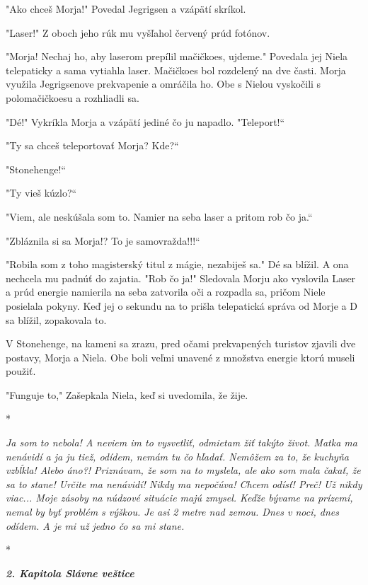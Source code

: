\documentclass{book}
\begin{document}
"$ $Ako chceš Morja!"$ $ Povedal Jegrigsen a vzápätí skríkol.

"Laser!"$ $ Z oboch jeho rúk mu vyšľahol červený prúd fotónov.

"Morja! Nechaj ho, aby laserom prepílil mačičkoes, ujdeme."$ $ Povedala jej Niela telepaticky a sama vytiahla laser. Mačičkoes bol rozdelený na dve časti. Morja využila Jegrigsenove prekvapenie a omráčila ho. Obe s Nielou vyskočili s polomačičkoesu a rozhliadli sa.

"Dé!"$ $ Vykríkla Morja a vzápätí jediné čo ju napadlo. "Teleport!“

"Ty sa chceš teleportovať Morja? Kde?“

"Stonehenge!“

"Ty vieš kúzlo?“

"Viem, ale neskúšala som to. Namier na seba laser a pritom rob čo ja.“

"Zbláznila si sa Morja!? To je samovražda!!!“

"Robila som z toho magisterský titul z mágie, nezabiješ sa."$ $ Dé sa blížil. A ona nechcela mu padnúť do zajatia. "Rob čo ja!"$ $ Sledovala Morju ako vyslovila Laser a prúd energie namierila na seba zatvorila oči a rozpadla sa, pričom Niele posielala pokyny. Keď jej o sekundu na to prišla telepatická správa od Morje a D sa blížil, zopakovala to.

V Stonehenge, na kameni sa zrazu, pred očami prekvapených turistov zjavili dve postavy, Morja a Niela. Obe boli veľmi unavené z množstva energie ktorú museli použiť.

"Funguje to,"$ $ Zašepkala Niela, keď si uvedomila, že žije.

\begin{center}
*
\end{center}

\textit{Ja som to nebola! A neviem im to vysvetliť, odmietam žiť takýto život. Matka ma nenávidí a ja ju tiež, odídem, nemám tu čo hľadať. Nemôžem za to, že kuchyňa vzbĺkla! Alebo áno?! Priznávam, že som na to myslela, ale ako som mala čakať, že sa to stane! Určite ma nenávidí! Nikdy ma nepočúva! Chcem odísť! Preč! Už nikdy viac... Moje zásoby na núdzové situácie majú zmysel. Keďže bývame na prízemí, nemal by byť problém s výškou. Je asi 2 metre nad zemou. Dnes v noci, dnes odídem. A je mi už jedno čo sa mi stane.}

\begin{center}
*
\end{center}

\begin{center}
\textit{\textbf{2. Kapitola Slávne veštice}}
\end{center}
\end{document}
